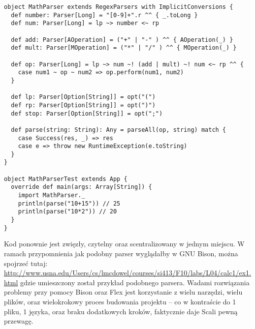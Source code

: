 \begin{lstlisting}
object MathParser extends RegexParsers with ImplicitConversions {
  def number: Parser[Long] = "[0-9]+".r ^^ { _.toLong }
  def num: Parser[Long] = lp ~> number <~ rp
  
  def add: Parser[AOperation] = ("+" | "-" ) ^^ { AOperation(_) }
  def mult: Parser[MOperation] = ("*" | "/" ) ^^ { MOperation(_) }

  def op: Parser[Long] = lp ~> num ~! (add | mult) ~! num <~ rp ^^ {
    case num1 ~ op ~ num2 => op.perform(num1, num2)
  }

  def lp: Parser[Option[String]] = opt("(")
  def rp: Parser[Option[String]] = opt(")")
  def stop: Parser[Option[String]] = opt(";")
  
  def parse(string: String): Any = parseAll(op, string) match {
    case Success(res, _) => res
    case e => throw new RuntimeException(e.toString)
  }
}

object MathParserTest extends App {
  override def main(args: Array[String]) {
    import MathParser._
    println(parse("10+15")) // 25
    println(parse("10*2")) // 20
  }
}
\end{lstlisting}


Kod ponownie jest zwięzły, czytelny oraz scentralizowany w jednym miejscu. W ramach przypomnienia jak podobny parser wyglądałby w GNU Bison, 
można spojrzeć tutaj: \href{http://www.usna.edu/Users/cs/lmcdowel/courses/si413/F10/labs/L04/calc1/ex1.html}{http://www.usna.edu/Users/cs/lmcdowel/courses/si413/F10/labs/L04/calc1/ex1.html}
gdzie umieszczony został przykład podobnego parsera. Wadami rozwiązania problemy przy pomocy Bison oraz Flex jest korzystanie z wielu narzędzi,
wielu plików, oraz wielokrokowy proces budowania projektu -- co w kontraście do 1 pliku, 1 języka, oraz braku dodatkowych kroków, faktycznie daje Scali pewną przewagę.
